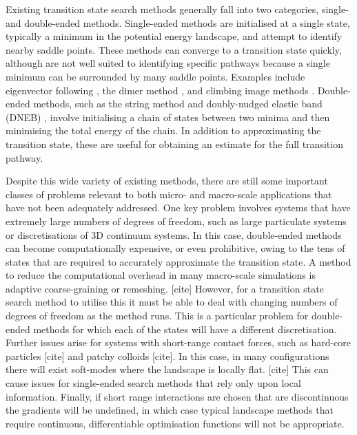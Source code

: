 \documentclass[aps,twocolumn]{revtex4-1}
\newcommand{\temp}[1]{{\leavevmode\color{red}#1}}
\begin{document}
\topic Existing transition state search methods generally fall into two categories, single- and double-ended methods.
Single-ended methods are initialised at a single state, typically a minimum in the potential energy landscape, and attempt to identify nearby saddle points.
These methods can converge to a transition state quickly, although are not well suited to identifying specific pathways because a single minimum can be surrounded by many saddle points.
Examples include eigenvector following \cite{Cerjan1981}, the dimer method \cite{Heyden2005,Kastner2008}, and climbing image methods \cite{E2007,Ren2013}.
Double-ended methods, such as the string method \cite{E2002,E2007} and doubly-nudged elastic band (DNEB) \cite{Trygubenko2004}, involve initialising a chain of states between two minima and then minimising the total energy of the chain.
In addition to approximating the transition state, these are useful for obtaining an estimate for the full transition pathway.

\topic Despite this wide variety of existing methods, there are still some important classes of problems relevant to both micro- and macro-scale applications that have not been adequately addressed.
One key problem involves systems that have extremely large numbers of degrees of freedom, such as large particulate systems or discretisations of 3D continuum systems.
In this case, double-ended methods can become computationally expensive, or even prohibitive, owing to the tens of states that are required to accurately approximate the transition state.
A method to reduce the computational overhead in many macro-scale simulations is adaptive coarse-graining or remeshing. \temp{[cite]}
However, for a transition state search method to utilise this it must be able to deal with changing numbers of degrees of freedom as the method runs.
This is a particular problem for double-ended methods for which each of the states will have a different discretisation.
Further issues arise for systems with short-range contact forces, such as hard-core particles \temp{[cite]} and patchy colloids \temp{[cite]}.
In this case, in many configurations there will exist soft-modes where the landscape is locally flat. \temp{[cite]}
This can cause issues for single-ended search methods that rely only upon local information.
Finally, if short range interactions are chosen that are discontinuous the gradients will be undefined, in which case typical landscape methods that require continuous, differentiable optimisation functions will not be appropriate.
\end{document}
